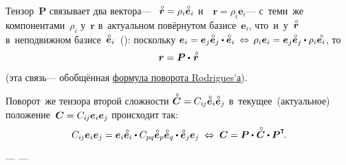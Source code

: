 \begin{otherlanguage}{russian}
\vspace{-0.4em} Тензор~$\bm{P}$ связывает два вектора\:--- ~${\mathcircabove{\bm{r}} = \rho_i \mathcircabove{\bm{e}}_i}$ и~~${\bm{r} = \rho_i \bm{e}_i}$\:--- с~теми~же компонентами~$\rho_i$ у~$\bm{r}$ в~актуальном повёрнутом базисе~${\bm{e}_i}$, что~и~у~${\mathcircabove{\bm{r}}}$ в~неподвижном базисе~${\mathcircabove{\bm{e}}_i}$~(): поскольку ${\bm{e}_i = \bm{e}_j \mathcircabove{\bm{e}}_j \dotp \mathcircabove{\bm{e}}_i \:\Leftrightarrow\, \rho_i \bm{e}_i = \bm{e}_j \mathcircabove{\bm{e}}_j \dotp \rho_i \mathcircabove{\bm{e}_i}}$, то
\begin{equation}\label{rodriguesrotationformula}
\bm{r} = \bm{P} \dotp\hspace{0.2ex} \mathcircabove{\bm{r}}
\end{equation}

\vspace{-0.4em} \noindent(эта связь\:--- обобщённая \href{https://fr.wikipedia.org/wiki/Rotation_vectorielle#Cas_g%C3%A9n%C3%A9ral}{формула поворота Rodrigues’а}).

\vspace{-0.1em}Поворот~же тензора второй сложности ${\mathcircabove{\bm{C}} = C_{i\hspace{-0.1ex}j} \mathcircabove{\bm{e}}_i \mathcircabove{\bm{e}}_j}$ в~текущее~(актуальное) положение~${\bm{C} = C_{i\hspace{-0.1ex}j} \bm{e}_i \bm{e}_j}$ происходит так:
\begin{equation}
C_{i\hspace{-0.1ex}j} \bm{e}_i \bm{e}_j = \bm{e}_i \mathcircabove{\bm{e}}_i \dotp C_{pq} \mathcircabove{\bm{e}}_p \mathcircabove{\bm{e}}_q \dotp \mathcircabove{\bm{e}}_j \bm{e}_j \;\Leftrightarrow\; \bm{C} = \bm{P} \dotp\hspace{0.1ex} \mathcircabove{\bm{C}} \dotp \bm{P}^{\T} \hspace{-0.32ex}.
\end{equation}

\end{otherlanguage}

 \:--- \:--- 

